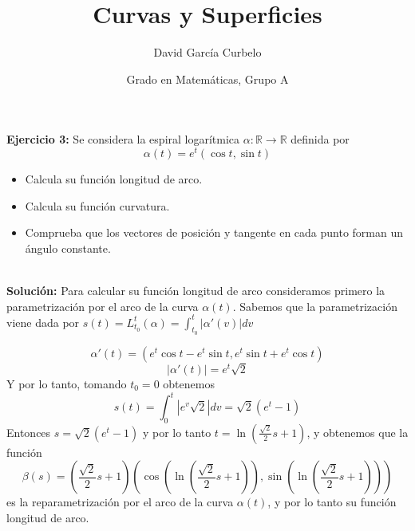\documentclass[fleqn]{article}
\author{David García Curbelo}
\title{Curvas y Superficies}
\date{Grado en Matemáticas, Grupo A}
\def\R{\mathds{R}}
\begin{document}
    
    \maketitle
    \setcounter{page}{1}
    \pagestyle{plain}

    {\bf{Ejercicio 3:}} Se considera la espiral logarítmica $\alpha : \R \longrightarrow \R$ definida por
    $$\alpha (t) = e^t \left(\cos t, \sin t\right)$$

    \begin{itemize}
        \item Calcula su función longitud de arco.
        \item Calcula su función curvatura.
        \item Comprueba que los vectores de posición y tangente en cada punto forman un ángulo constante.\\ \\
    \end{itemize}

    {\bf{Solución:}} Para calcular su función longitud de arco consideramos primero la parametrización por el
    arco de la curva $\alpha (t)$. Sabemos que la parametrización viene dada por 
    $s(t) = L _{t_0}^t (\alpha) = \int _{t_0}^t |\alpha '(v)| dv$

    $$\alpha '(t) =\left(e^t \cos t - e^t \sin t, e^t\sin t + e^t\cos t\right)$$
    $$|\alpha '(t)|=e^t \sqrt{2}$$
    Y por lo tanto, tomando $t_0=0$ obtenemos 
    $$s(t) = \int _{0}^t |e^v \sqrt{2}| dv = \sqrt{2}(e^t-1)$$
    Entonces $s=\sqrt{2}(e^t-1)$ y por lo tanto $t=\ln \left(\frac{\sqrt{2}}{2}s+1\right)$, y obtenemos que la 
    función 
    $$\beta (s)=\left(\frac{\sqrt{2}}{2}s+1\right) \left(\cos \left(\ln \left(\frac{\sqrt{2}}{2}s+1\right)\right), 
    \sin \left(\ln \left(\frac{\sqrt{2}}{2}s+1\right)\right)\right)$$
    es la reparametrización por el arco de la curva $\alpha (t)$, y por lo tanto su función longitud de arco. \\ \\
\end{document}
